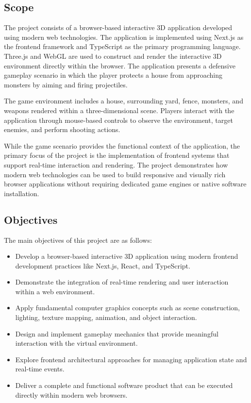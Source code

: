 \documentclass[11pt,a4paper]{article}
\begin{document}
\subsection{Scope}

The project consists of a browser-based interactive 3D application developed
using modern web technologies. The application is implemented using Next.js as
the frontend framework and TypeScript as the primary programming language.
Three.js and WebGL are used to construct and render the interactive 3D
environment directly within the browser. The application presents a defensive
gameplay scenario in which the player protects a house from approaching
monsters by aiming and firing projectiles.

The game environment includes a house, surrounding yard, fence, monsters, and
weapons rendered within a three-dimensional scene. Players interact with the
application through mouse-based controls to observe the environment, target
enemies, and perform shooting actions.

While the game scenario provides the functional context of the application, the
primary focus of the project is the implementation of frontend systems that
support real-time interaction and rendering. The project demonstrates how
modern web technologies can be used to build responsive and visually rich
browser applications without requiring dedicated game engines or native
software installation.

\subsection{Objectives}

The main objectives of this project are as follows:

\begin{itemize}
  \item Develop a browser-based interactive 3D application using modern
        frontend development practices like Next.js, React, and TypeScript.
  \item Demonstrate the integration of real-time rendering and user interaction
        within a web environment.
  \item Apply fundamental computer graphics concepts such as scene
        construction, lighting, texture mapping, animation, and object
        interaction.
  \item Design and implement gameplay mechanics that provide meaningful
        interaction with the virtual environment.
  \item Explore frontend architectural approaches for managing application
        state and real-time events.
  \item Deliver a complete and functional software product that can be executed
        directly within modern web browsers.
\end{itemize}
\end{document}
